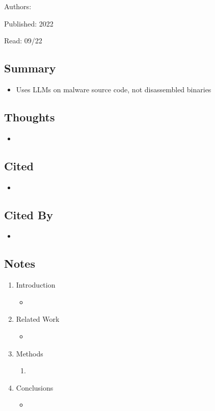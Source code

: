 \documentclass{article}
\begin{document}
\noindent Authors: 

\noindent Published: 2022

\noindent Read: 09/22

\subsection*{Summary}
\begin{itemize}
	\item Uses LLMs on malware source code, not disassembled binaries
\end{itemize}

\subsection*{Thoughts}
\begin{itemize}
	\item
\end{itemize}

\subsection*{Cited}
\begin{itemize}
	\item
\end{itemize}

\subsection*{Cited By}
\begin{itemize}
	\item
\end{itemize}

\subsection*{Notes}

\begin{enumerate}
	\item Introduction
	\begin{itemize}
		\item 
	\end{itemize}
	\item Related Work
	\begin{itemize}
		\item 
	\end{itemize}
	\item Methods
	\begin{enumerate}
		\item 
	\end{enumerate}
	\item Conclusions
	\begin{itemize}
		\item 
	\end{itemize}
\end{enumerate}
\end{document}
